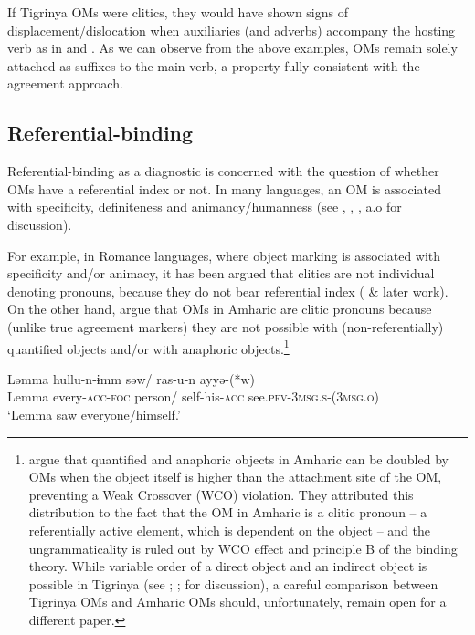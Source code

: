 \documentclass[output=paper]{langscibook}
\begin{document}
\noindent If Tigrinya OMs were clitics, they would have shown signs of displacement\slash dislocation when auxiliaries (and adverbs) accompany the hosting verb as in  and . As we can observe from the above examples, OMs remain solely attached as suffixes to the main verb, a property fully consistent with the agreement approach.


\subsection{Referential-binding}

Referential-binding as a diagnostic is concerned with the question of whether OMs have a referential index or not. In many languages, an OM is associated with specificity, definiteness and animancy/humanness (see \citealt{aissen03}, \citealt{danon2006}, \citealt{kalin16}, a.o for discussion). 

For example, in Romance languages, where object marking is associated with specificity and/or animacy, it has been argued that clitics are not individual denoting pronouns, because they do not bear referential index (\citealt{sport96} \& later work). On the other hand, \citet{bakerandkramer18} argue that OMs in Amharic are clitic pronouns because (unlike true agreement markers) they are not possible with (non-referentially) quantified objects and/or with anaphoric objects.\footnote{\citet{bakerandkramer18} argue that quantified and anaphoric objects in Amharic can be doubled by OMs when the object itself is higher than the attachment site of the OM, preventing a Weak Crossover (WCO) violation. They attributed this distribution to the fact that the OM in Amharic is a clitic pronoun -- a referentially active element, which is dependent on the object -- and the ungrammaticality is ruled out by WCO effect and principle B of the binding theory. While variable order of a direct object and an indirect object is possible in Tigrinya (see \citealt{mason96}; \citealt{kifle07}; for discussion), a careful comparison between Tigrinya OMs and Amharic OMs should, unfortunately, remain open for a different paper.}


\ea\label{ex:Gebregziabher:amharic}
\gll Ləmma hullu-n-ɨmm səw/ ras-u-n ayyə-(*w) \\ 
Lemma every-{\scshape acc-foc} person/ self-his-{\scshape acc} see.{\scshape pfv-3msg.s-(3msg.o}) \\
\glt `Lemma saw everyone/himself.'
\z
\end{document}
